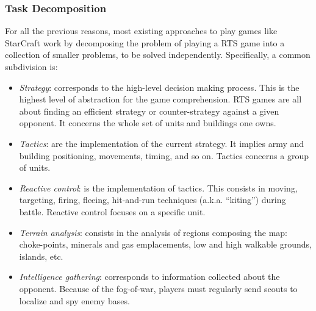 \documentclass[journal]{IEEEtran}
\begin{document}
\subsubsection{Task Decomposition}
For all the previous reasons, most existing approaches to play games like StarCraft work by decomposing the problem of playing a RTS game into a collection of smaller problems, to be solved independently. Specifically, a common subdivision is:
\begin{itemize}
\item {\em Strategy}: corresponds to the high-level decision making process.  This is
  the  highest level of  abstraction for  the game  comprehension. RTS
  games   are   all   about   finding   an   efficient   strategy   or
  counter-strategy  against a  given opponent.  It concerns  the whole
  set of  units and buildings  one owns. %
\item  {\em Tactics}: are  the implementation  of the  current  strategy. It
  implies  army and  building positioning,  movements, timing,  and so
  on.  Tactics concerns a  group of  units. %
\item  {\em Reactive  control}: is  the  implementation  of  tactics.  This
  consists   in  moving,   targeting,  firing,   fleeing,  hit-and-run
  techniques (a.k.a. ``kiting'')  during battle. Reactive control focuses
  on a specific unit. %
%
\item {\em Terrain analysis}: consists  in the analysis of regions composing
  the  map:  choke-points,  minerals  and  gas emplacements,  low  and  high
  walkable grounds, islands, etc.
\item {\em Intelligence gathering}:  corresponds to information collected about
  the  opponent. Because of  the fog-of-war,  players must
  regularly send scouts to localize and spy enemy bases.%
\end{itemize}
\end{document}
